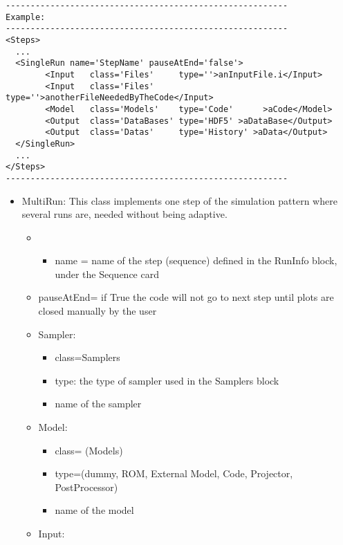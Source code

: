\begin{lstlisting}[style=XML]
---------------------------------------------------------
Example:
---------------------------------------------------------
<Steps>
  ...
  <SingleRun name='StepName' pauseAtEnd='false'> 
        <Input   class='Files'     type=''>anInputFile.i</Input>
        <Input   class='Files'     type=''>anotherFileNeededByTheCode</Input>
        <Model   class='Models'    type='Code'      >aCode</Model>
        <Output  class='DataBases' type='HDF5' >aDataBase</Output>
        <Output  class='Datas'     type='History' >aData</Output>
  </SingleRun>
  ...
</Steps>
---------------------------------------------------------
\end{lstlisting}



\begin{itemize}
\item MultiRun: This class implements one step of the simulation pattern where several runs are, needed without being adaptive.  
\begin{itemize}
\item
	\begin{itemize}
	\item name = name of the step (sequence) defined in the RunInfo block, under the Sequence card
	\end{itemize}
\item pauseAtEnd= if True the code will not go to next step until plots are closed manually by the user
\end{itemize}
\begin{itemize}
\item Sampler: 
\begin {itemize}
\item class=Samplers 
\item type: the type of sampler used in the Samplers block 
\item name of the sampler
\end{itemize}
\item Model: 
\begin{itemize}
\item class= (Models) 
\item type=(dummy, ROM, External Model, Code, Projector, PostProcessor) 
\item name of the model
\end{itemize}
\item Input:  
\begin{itemize}

\end{itemize}
\end{itemize}
\end{itemize}
